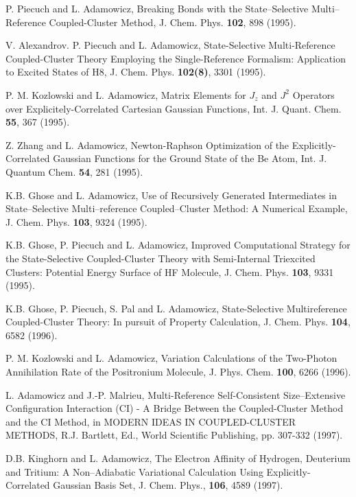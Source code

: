 \begin{thebibliography}{999}
P. Piecuch and L. Adamowicz, Breaking 
Bonds with the State--Selective Multi--Reference Coupled-Cluster 
Method, J. Chem. Phys. {\bf 102}, 898 (1995).


V. Alexandrov. P. Piecuch and L. Adamowicz, 
State-Selective Multi-Reference Coupled-Cluster Theory
Employing the Single-Reference Formalism:  Application 
to Excited States of H8, J. Chem. Phys.
{\bf 102(8)}, 3301 (1995).

P. M. Kozlowski and L. Adamowicz, Matrix Elements 
for  $J_z$ and $J^2$  Operators over Explicitely-Correlated
Cartesian Gaussian Functions, 
Int. J. Quant. Chem. {\bf 55}, 367 (1995).

Z. Zhang and L. Adamowicz, Newton-Raphson Optimization 
of the Explicitly-Correlated Gaussian
Functions for the Ground State of the Be Atom, 
Int. J. Quantum Chem.  {\bf 54}, 281 (1995).

K.B. Ghose and L. Adamowicz, Use of Recursively 
Generated Intermediates in State--Selective
Multi--reference Coupled--Cluster Method:  
A Numerical Example, J. Chem. Phys. {\bf 103}, 9324 (1995).



K.B. Ghose, P. Piecuch and L. Adamowicz, 
Improved Computational Strategy for the State-Selective
Coupled-Cluster Theory with Semi-Internal Triexcited Clusters:  
Potential Energy Surface of HF
Molecule, J. Chem. Phys. {\bf 103}, 9331 (1995).

K.B. Ghose, P. Piecuch, S. Pal and L. Adamowicz, 
State-Selective Multireference Coupled-Cluster
Theory:  In pursuit of Property Calculation, 
J. Chem. Phys. {\bf 104}, 6582 (1996).

P. M. Kozlowski and L. Adamowicz, Variation 
Calculations of the Two-Photon Annihilation Rate of the
Positronium Molecule, J. Phys. Chem. {\bf 100}, 6266 (1996).



L. Adamowicz and J.-P. Malrieu, Multi-Reference Self-Consistent 
Size--Extensive Configuration
Interaction (CI) - A Bridge Between the Coupled-Cluster 
Method and the CI Method, in MODERN
IDEAS IN COUPLED-CLUSTER METHODS, R.J. Bartlett, 
Ed., World Scientific Publishing, pp. 307-332 (1997).

D.B. Kinghorn and L. Adamowicz, 
The Electron Affinity of Hydrogen, Deuterium and Tritium:  
A Non--Adiabatic Variational Calculation Using Explicitly-Correlated 
Gaussian Basis Set, J. Chem. Phys.,
{\bf 106}, 4589 (1997).


\end{thebibliography}
